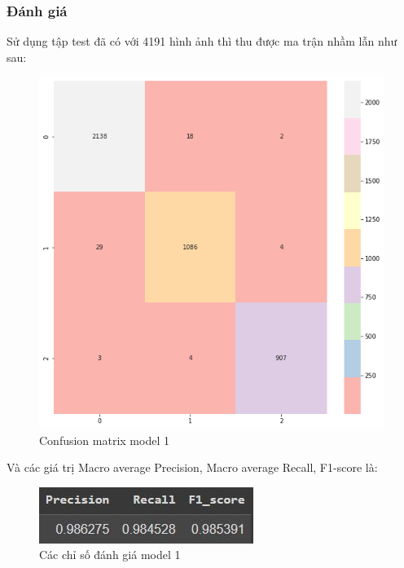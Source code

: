 \subsubsection{Đánh giá}
Sử dụng tập test đã có với 4191 hình ảnh thì thu được ma trận nhầm lẫn như sau:
\begin{center}
    \begin{figure}[!h]
        \centering
        \includegraphics[scale = 0.4]{fileanh/11.png}
        \caption{Confusion matrix model 1}
    \end{figure}
\end{center}
Và các giá trị Macro average Precision, Macro average Recall, F1-score là:
\begin{center}
    \begin{figure}[!h]
        \centering
        \includegraphics[scale = 1.5]{fileanh/12.jpg}
        \caption{Các chỉ số đánh giá model 1}
    \end{figure}
\end{center}


